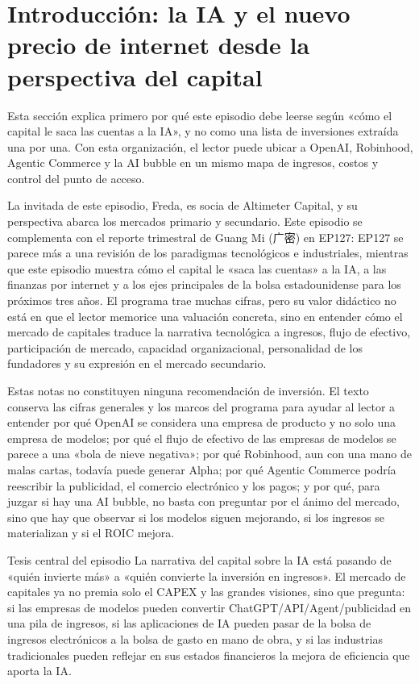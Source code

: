 \section{Introducción: la IA y el nuevo precio de internet desde la perspectiva del capital}

Esta sección explica primero por qué este episodio debe leerse según «cómo el capital le saca las cuentas a la IA», y no como una lista de inversiones extraída una por una. Con esta organización, el lector puede ubicar a OpenAI, Robinhood, Agentic Commerce y la AI bubble en un mismo mapa de ingresos, costos y control del punto de acceso.

La invitada de este episodio, Freda, es socia de Altimeter Capital, y su perspectiva abarca los mercados primario y secundario. Este episodio se complementa con el reporte trimestral de Guang Mi (广密) en EP127: EP127 se parece más a una revisión de los paradigmas tecnológicos e industriales, mientras que este episodio muestra cómo el capital le «saca las cuentas» a la IA, a las finanzas por internet y a los ejes principales de la bolsa estadounidense para los próximos tres años. El programa trae muchas cifras, pero su valor didáctico no está en que el lector memorice una valuación concreta, sino en entender cómo el mercado de capitales traduce la narrativa tecnológica a ingresos, flujo de efectivo, participación de mercado, capacidad organizacional, personalidad de los fundadores y su expresión en el mercado secundario.

Estas notas no constituyen ninguna recomendación de inversión. El texto conserva las cifras generales y los marcos del programa para ayudar al lector a entender por qué OpenAI se considera una empresa de producto y no solo una empresa de modelos; por qué el flujo de efectivo de las empresas de modelos se parece a una «bola de nieve negativa»; por qué Robinhood, aun con una mano de malas cartas, todavía puede generar Alpha; por qué Agentic Commerce podría reescribir la publicidad, el comercio electrónico y los pagos; y por qué, para juzgar si hay una AI bubble, no basta con preguntar por el ánimo del mercado, sino que hay que observar si los modelos siguen mejorando, si los ingresos se materializan y si el ROIC mejora.

\begin{importantbox}{Tesis central del episodio}
La narrativa del capital sobre la IA está pasando de «quién invierte más» a «quién convierte la inversión en ingresos». El mercado de capitales ya no premia solo el CAPEX y las grandes visiones, sino que pregunta: si las empresas de modelos pueden convertir ChatGPT/API/Agent/publicidad en una pila de ingresos, si las aplicaciones de IA pueden pasar de la bolsa de ingresos electrónicos a la bolsa de gasto en mano de obra, y si las industrias tradicionales pueden reflejar en sus estados financieros la mejora de eficiencia que aporta la IA.
\end{importantbox}

